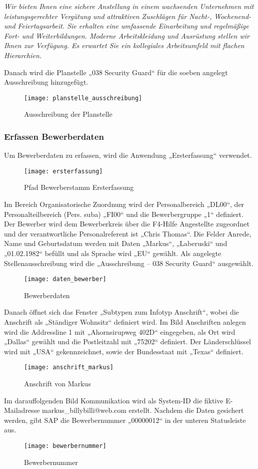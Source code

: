 \textsl{
	Wir bieten Ihnen eine sichere Anstellung in einem wachsenden Unternehmen mit leistungsgerechter Vergütung und attraktiven Zuschlägen für Nacht-, Wochenend- und Feiertagsarbeit. Sie erhalten eine umfassende Einarbeitung und regelmäßige Fort- und Weiterbildungen. Moderne Arbeitskleidung und Ausrüstung stellen wir Ihnen zur Verfügung. Es erwartet Sie ein kollegiales Arbeitsumfeld mit flachen Hierarchien.
}

Danach wird die Planstelle „038 Security Guard“ für die soeben angelegt Ausschreibung hinzugefügt.
\begin{figure}[H]
	\centering
	\texttt{[image: planstelle\_ausschreibung]}
	\caption{Ausschreibung der Planstelle}
	\label{fig:planstelle_ausschreibung}
\end{figure}

\subsubsection{Erfassen Bewerberdaten}
Um Bewerberdaten zu erfassen, wird die Anwendung „Ersterfassung“ verwendet.
\begin{figure}[H]
	\centering
	\texttt{[image: ersterfassung]}
	\caption{Pfad Bewerberstamm Ersterfassung}
	\label{fig:ersterfassung}
\end{figure}
Im Bereich Organisatorische Zuordnung wird der Personalbereich „DL00“,  der Personalteilbereich (Pers. suba) „FI00“ und die Bewerbergruppe „1“ definiert. Der Bewerber wird dem Bewerberkreis über die F4-Hilfe Angestellte zugeordnet und der verantwortliche Personalreferent ist „Chris Thomas“. Die Felder Anrede, Name und Geburtsdatum werden mit Daten „Markus“, „Laberuski“ und „01.02.1982“ befüllt und als Sprache wird „EU“ gewählt. Als angelegte Stellenausschreibung wird die „Ausschreibung – 038 Security Guard“ ausgewählt.
\begin{figure}[H]
	\centering
	\texttt{[image: daten\_bewerber]}
	\caption{Bewerberdaten}
	\label{fig:daten_bewerber}
\end{figure}
Danach öffnet sich das Fenster „Subtypen zum Infotyp Anschrift“, wobei die Anschrift als „Ständiger Wohnsitz“ definiert wird. Im Bild Anschriften anlegen wird die Addressline 1 mit „Ahornsirupweg 402D“ eingegeben, als Ort wird „Dallas“ gewählt und die Postleitzahl mit „75202“ definiert. Der Länderschlüssel wird mit „USA“ gekennzeichnet, sowie der Bundesstaat mit „Texas“ definiert.
\begin{figure}[H]
	\centering
	\texttt{[image: anschrift\_markus]}
	\caption{Anschrift von Markus}
	\label{fig:anschrift_markus}
\end{figure}
Im darauffolgenden Bild Kommunikation wird als System-ID die fiktive E-Mailadresse markus\_billybilli@web.com erstellt. Nachdem die Daten gesichert werden, gibt SAP die Bewerbernummer „00000012“ in der unteren Statusleiste aus.
\begin{figure}[H]
	\centering
	\texttt{[image: bewerbernummer]}
	\caption{Bewerbernummer}
	\label{fig:bewerbernummer}
\end{figure}

